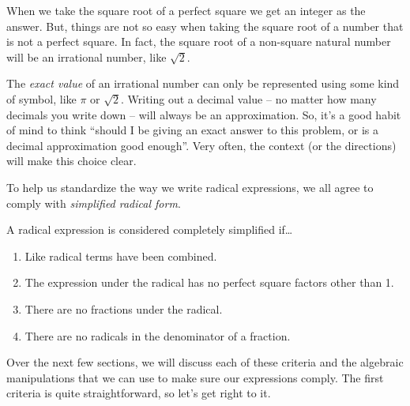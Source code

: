 
When we take the square root of a perfect square we get an integer as the answer. But, things are not so easy when taking the square root of a number that is not a perfect square. In fact, the square root of a non-square natural number will be an irrational number, like $\sqrt{2}$.

The \textit{exact value} of an irrational number can only be represented using some kind of symbol, like $\pi$ or $\sqrt2$. Writing out a decimal value -- no matter how many decimals you write down -- will always be an approximation. So, it's a good habit of mind to think ``should I be giving an exact answer to this problem, or is a decimal approximation good enough''. Very often, the context (or the directions) will make this choice clear.

To help us standardize the way we write radical expressions, we all agree to comply with \textit{simplified radical form}.

\begin{boxedcriteria}
A radical expression is considered completely simplified if\ldots
\begin{enumerate}
\item Like radical terms have been combined.
\item The expression under the radical has no perfect square factors other than 1.
\item There are no fractions under the radical.
\item There are no radicals in the denominator of a fraction.
\end{enumerate}
\end{boxedcriteria}

Over the next few sections, we will discuss each of these criteria and the algebraic manipulations that we can use to make sure our expressions comply. The first criteria is quite straightforward, so let's get right to it.

